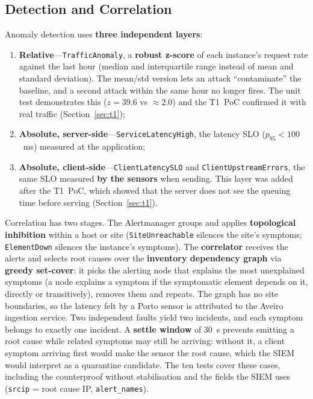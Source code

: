 \documentclass[11pt,a4paper]{article}
\begin{document}
\subsection{Detection and Correlation}

Anomaly detection uses \textbf{three independent layers}:

\begin{enumerate}
  \item \textbf{Relative}---\texttt{TrafficAnomaly}, a \textbf{robust z-score} of each
    instance's request rate against the last hour (median and interquartile range instead of
    mean and standard deviation). The mean/std version lets an attack ``contaminate'' the
    baseline, and a second attack within the same hour no longer fires. The unit test
    demonstrates this ($z = 39.6$ vs $\approx 2.0$) and the T1~PoC confirmed it with real
    traffic (Section~\ref{sec:t1});
  \item \textbf{Absolute, server-side}---\texttt{ServiceLatencyHigh}, the latency SLO
    ($p_{95} < 100$~ms) measured at the application;
  \item \textbf{Absolute, client-side}---\texttt{ClientLatencySLO} and
    \texttt{ClientUpstreamErrors}, the same SLO measured \textbf{by the sensors} when
    sending. This layer was added after the T1~PoC, which showed that the server does not
    see the queuing time before serving (Section~\ref{sec:t1}).
\end{enumerate}

Correlation has two stages. The Alertmanager groups and applies \textbf{topological
inhibition} within a host or site (\texttt{SiteUnreachable} silences the site's symptoms;
\texttt{ElementDown} silences the instance's symptoms). The \textbf{correlator} receives the
alerts and selects root causes over the \textbf{inventory dependency graph} via
\textbf{greedy set-cover}: it picks the alerting node that explains the most unexplained
symptoms (a node explains a symptom if the symptomatic element depends on it, directly or
transitively), removes them and repeats. The graph has no site boundaries, so the latency
felt by a Porto sensor is attributed to the Aveiro ingestion service. Two independent faults
yield two incidents, and each symptom belongs to exactly one incident. A \textbf{settle
window} of 30~s prevents emitting a root cause while related symptoms may still be arriving:
without it, a client symptom arriving first would make the sensor the root cause, which the
SIEM would interpret as a quarantine candidate. The ten tests cover these cases, including
the counterproof without stabilisation and the fields the SIEM uses (\texttt{srcip} = root
cause IP, \texttt{alert\_names}).
\end{document}
